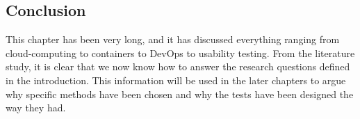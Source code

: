 \subsection{Conclusion}
This chapter has been very long, and it has discussed everything ranging from cloud-computing to containers to DevOps to usability testing. From the literature study, it is clear that we now know how to answer the research questions defined in the introduction. This information will be used in the later chapters to argue why specific methods have been chosen and why the tests have been designed the way they had. 
